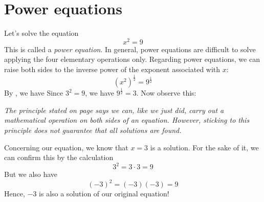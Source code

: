 \newpage
{}
\newpage
{}
\section{Power equations}
Let's solve the equation
\[ x^2=9 \]
This is called a \textit{power equation}. In general, power equations are difficult to solve applying the four elementary operations only. Regarding power equations, we can raise both sides to the inverse power of the exponent associated with $ x $:
\[ \left(x^2\right)^\frac{1}{2}=9^\frac{1}{2} \]
By , we have
Since $ 3^2=9 $, we have $ 9^\frac{1}{2}=3 $. Now observe this: \vsk

\textit{The principle stated on page \pageref{principle} says we can, like we just did, carry out a mathematical operation on both sides of an equation. However, sticking to this principle does not guarantee that all solutions are found.} \\ \vsk

Concerning our equation, we know that $ {x=3} $ is a solution. For the sake of it, we can confirm this by the calculation
\[ 3^2=3\cdot3=9 \]
But we also have
\[ (-3)^2=(-3)(-3)=9 \]
Hence, $ -3 $ is also a solution of our original equation!

